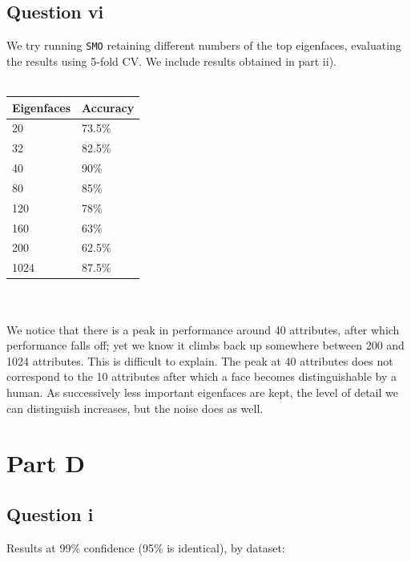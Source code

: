 \documentclass[a4paper]{article}
\begin{document}
\subsection*{Question vi}
We try running {\tt SMO} retaining different numbers of the top eigenfaces, evaluating the results using 5-fold CV. We include results obtained in part ii).\\
\\
\begin{tabular}{ll}
Eigenfaces & Accuracy \\
\hline
20 & 73.5\% \\
32 & 82.5\% \\
40 & 90\% \\
80 & 85\% \\
120 & 78\% \\
160 & 63\% \\
200 & 62.5\% \\
1024 & 87.5\% \\
\end{tabular}\\
\\
We notice that there is a peak in performance around 40 attributes, after which performance falls off; yet we know it climbs back up somewhere between 200 and 1024 attributes. This is difficult to explain. The peak at 40 attributes does not correspond to the 10 attributes after which a face becomes distinguishable by a human. As successively less important eigenfaces are kept, the level of detail we can distinguish increases, but the noise does as well. 

\section*{Part D}
\subsection*{Question i}

Results at 99\% confidence (95\% is identical), by dataset:
\end{document}
